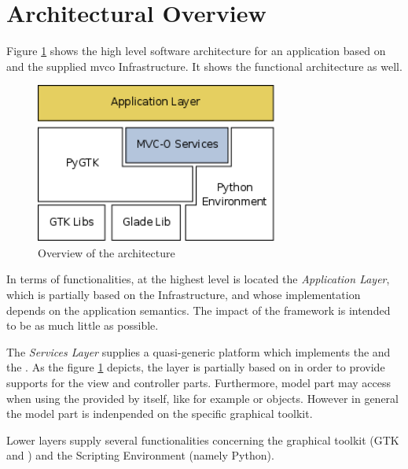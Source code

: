 \section{\label{ARCH} Architectural Overview}

Figure \ref{HLA_f} shows the high level software architecture for an
application based on \pygtk and the supplied {mvco} Infrastructure. It
shows the functional architecture as well.

\begin{figure}[htbp]
\begin{center}
\includegraphics[width=8cm]{figs/png/arch.png}
\caption{\label{HLA_f}Overview of the architecture}
\end{center}
\end{figure}



In terms of functionalities, at the highest level is located the
\emph{Application Layer}, which is partially based on the \mvco
Infrastructure, and whose implementation depends on the application
semantics. The impact of the framework is intended to be as much
little as possible. 

The \emph{\mvco Services Layer} supplies a quasi-generic platform
which implements the \mvc and the \obs. As the figure \ref{HLA_f}
depicts, the \mvco layer is partially based on \pygtk in order to
provide supports for the view and controller parts. Furthermore, model
part may access \pygtk when using the \mvc provided by \pygtk itself,
like for example  or 
objects. However in general the model part is indenpended on the
specific graphical toolkit.

Lower layers supply several functionalities concerning the graphical
toolkit (GTK and \glade) and the Scripting Environment (namely
Python).



